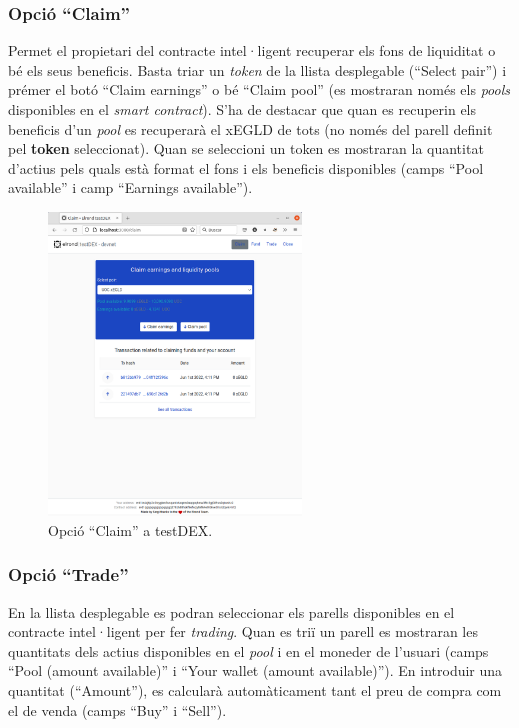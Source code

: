 \documentclass[11pt,a4paper]{article}
\begin{document}
\subsubsection{Opció ``Claim''}
Permet el propietari del contracte intel·ligent recuperar els fons de liquiditat o bé els seus beneficis. Basta triar un \textit{token} de la llista desplegable (``Select pair'') i prémer el botó ``Claim earnings'' o bé ``Claim pool'' (es mostraran només els \textit{pools} disponibles en el \textit{smart contract}). S'ha de destacar que quan es recuperin els beneficis d'un \textit{pool} es recuperarà el xEGLD de tots (no només del parell definit pel \textbf{token} seleccionat). Quan se seleccioni un token es mostraran la quantitat d'actius pels quals està format el fons i els beneficis disponibles (camps ``Pool available'' i camp ``Earnings available'').

\begin{figure}[h]
\includegraphics[width=0.6\textwidth]{manualclaim.png}
\centering
\caption{Opció ``Claim'' a testDEX.}\label{fig:manualclaim}
\end{figure} 

\subsubsection{Opció ``Trade''}
En la llista desplegable es podran seleccionar els parells disponibles en el contracte intel·ligent per fer \textit{trading}. Quan es triï un parell es mostraran les quantitats dels actius disponibles en el \textit{pool} i en el moneder de l'usuari (camps ``Pool (amount available)'' i ``Your wallet (amount available)''). En introduir una quantitat (``Amount''), es calcularà automàticament tant el preu de compra com el de venda (camps ``Buy'' i ``Sell'').
\end{document}
